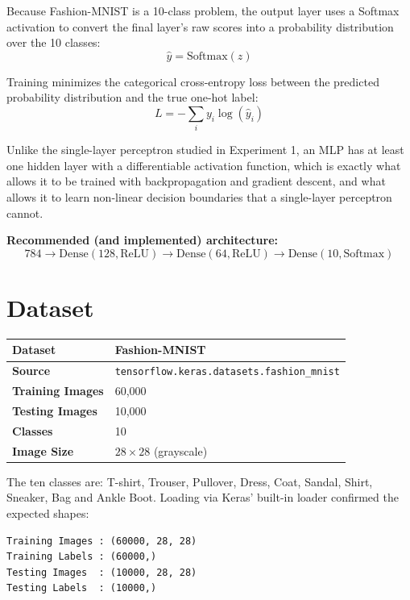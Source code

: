 \documentclass[11pt]{article}
\begin{document}
Because Fashion-MNIST is a 10-class problem, the output layer uses a Softmax activation to convert the final layer's raw scores into a probability distribution over the 10 classes:
\[
\hat{y} = \mathrm{Softmax}(z)
\]

Training minimizes the categorical cross-entropy loss between the predicted probability distribution and the true one-hot label:
\[
L = -\sum_{i} y_i \log(\hat{y}_i)
\]

Unlike the single-layer perceptron studied in Experiment 1, an MLP has at least one hidden layer with a differentiable activation function, which is exactly what allows it to be trained with backpropagation and gradient descent, and what allows it to learn non-linear decision boundaries that a single-layer perceptron cannot.

\textbf{Recommended (and implemented) architecture:}
\[
784 \rightarrow \text{Dense}(128, \text{ReLU}) \rightarrow \text{Dense}(64, \text{ReLU}) \rightarrow \text{Dense}(10, \text{Softmax})
\]

\section{Dataset}
\begin{center}
\begin{tabular}{|l|l|}
\hline
\textbf{Dataset} & Fashion-MNIST \\
\hline
\textbf{Source} & \texttt{tensorflow.keras.datasets.fashion\_mnist} \\
\hline
\textbf{Training Images} & 60{,}000 \\
\hline
\textbf{Testing Images} & 10{,}000 \\
\hline
\textbf{Classes} & 10 \\
\hline
\textbf{Image Size} & $28 \times 28$ (grayscale) \\
\hline
\end{tabular}
\end{center}

The ten classes are: T-shirt, Trouser, Pullover, Dress, Coat, Sandal, Shirt, Sneaker, Bag and Ankle Boot. Loading via Keras' built-in loader confirmed the expected shapes:
\begin{verbatim}
Training Images : (60000, 28, 28)
Training Labels : (60000,)
Testing Images  : (10000, 28, 28)
Testing Labels  : (10000,)
\end{verbatim}

\end{document}
